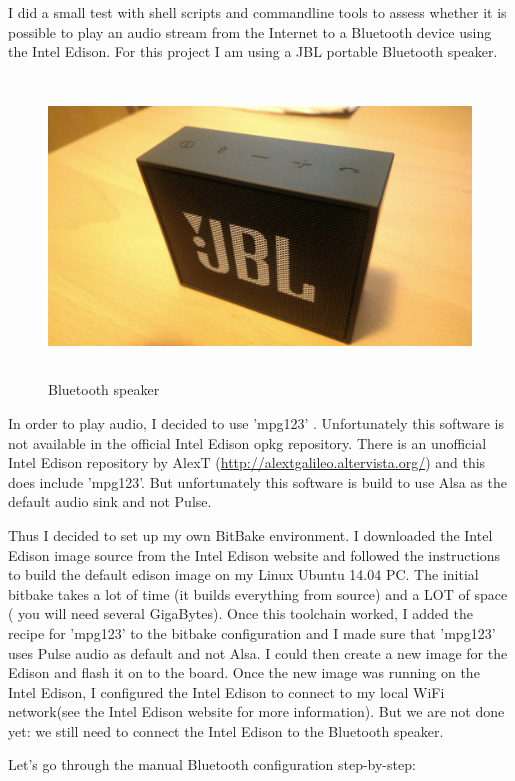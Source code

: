 \documentclass[12pt,a4paper]{scrreprt}
\begin{document}
I did a small test with shell scripts and commandline tools to assess whether it is possible to play an audio stream from the Internet to a Bluetooth device using the  Intel Edison.
For this project I am using a JBL portable Bluetooth speaker.

\begin{figure}[h]
	\includegraphics[height=300px]{images/speaker}
	\caption{Bluetooth speaker}
\end{figure}

In order to play  audio, I decided to use 'mpg123' . Unfortunately this software is not available in the official Intel Edison opkg repository. There is an unofficial Intel Edison repository by AlexT (\url{http://alextgalileo.altervista.org/}) and this does include 'mpg123'. But unfortunately this software is build to use Alsa as the default audio sink and not Pulse. 

Thus I decided to set up my own BitBake environment. 
I downloaded the Intel Edison image source from the Intel Edison website and followed the instructions to build the default edison image on my Linux Ubuntu 14.04 PC. 
The initial bitbake takes a lot of time (it builds everything from source) and a LOT of space ( you will need several GigaBytes). 
Once this toolchain worked, I added the recipe for 'mpg123' to the bitbake configuration and I made sure that 'mpg123' uses Pulse audio as default and not Alsa. I could then create a new image for the Edison and flash it on to the board. Once the new image was running on the Intel Edison, I configured the Intel Edison to connect to my local WiFi network(see the Intel Edison website for more information). But we are not done yet: we still need to connect the Intel Edison to the Bluetooth speaker.

Let's go through the manual Bluetooth configuration step-by-step:
\end{document}
